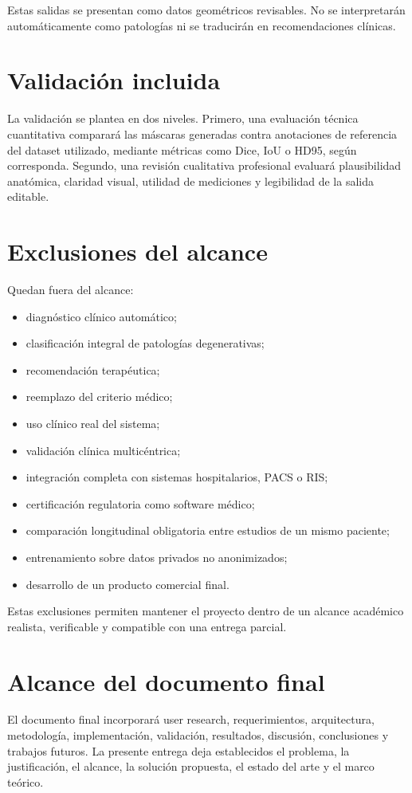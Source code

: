Estas salidas se presentan como datos geom\'etricos revisables. No se interpretar\'an autom\'aticamente como patolog\'ias ni se traducir\'an en recomendaciones cl\'inicas.

\section{Validaci\'on incluida}

La validaci\'on se plantea en dos niveles. Primero, una evaluaci\'on t\'ecnica cuantitativa comparar\'a las m\'ascaras generadas contra anotaciones de referencia del dataset utilizado, mediante m\'etricas como Dice, IoU o HD95, seg\'un corresponda. Segundo, una revisi\'on cualitativa profesional evaluar\'a plausibilidad anat\'omica, claridad visual, utilidad de mediciones y legibilidad de la salida editable.

\section{Exclusiones del alcance}

Quedan fuera del alcance:

\begin{itemize}
    \item diagn\'ostico cl\'inico autom\'atico;
    \item clasificaci\'on integral de patolog\'ias degenerativas;
    \item recomendaci\'on terap\'eutica;
    \item reemplazo del criterio m\'edico;
    \item uso cl\'inico real del sistema;
    \item validaci\'on cl\'inica multic\'entrica;
    \item integraci\'on completa con sistemas hospitalarios, PACS o RIS;
    \item certificaci\'on regulatoria como software m\'edico;
    \item comparaci\'on longitudinal obligatoria entre estudios de un mismo paciente;
    \item entrenamiento sobre datos privados no anonimizados;
    \item desarrollo de un producto comercial final.
\end{itemize}

Estas exclusiones permiten mantener el proyecto dentro de un alcance acad\'emico realista, verificable y compatible con una entrega parcial.

\section{Alcance del documento final}

El documento final incorporar\'a user research, requerimientos, arquitectura, metodolog\'ia, implementaci\'on, validaci\'on, resultados, discusi\'on, conclusiones y trabajos futuros. La presente entrega deja establecidos el problema, la justificaci\'on, el alcance, la soluci\'on propuesta, el estado del arte y el marco te\'orico.

